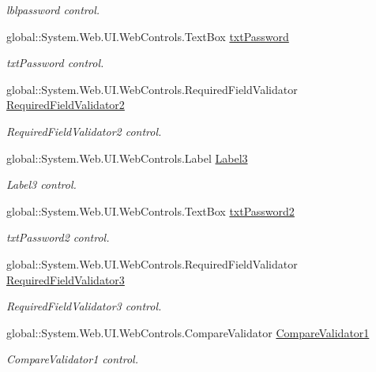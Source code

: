 \begin{DoxyCompactItemize}
\begin{DoxyCompactList}\small\item\em lblpassword control. \end{DoxyCompactList}\item 
global\+::\+System.\+Web.\+U\+I.\+Web\+Controls.\+Text\+Box \mbox{\hyperlink{classwebprueba_1_1_cambiar_password_af63494732a261ab56a7acbe72b1a1878}{txt\+Password}}
\begin{DoxyCompactList}\small\item\em txt\+Password control. \end{DoxyCompactList}\item 
global\+::\+System.\+Web.\+U\+I.\+Web\+Controls.\+Required\+Field\+Validator \mbox{\hyperlink{classwebprueba_1_1_cambiar_password_a961a06f8d25322b712d493b0beaed825}{Required\+Field\+Validator2}}
\begin{DoxyCompactList}\small\item\em Required\+Field\+Validator2 control. \end{DoxyCompactList}\item 
global\+::\+System.\+Web.\+U\+I.\+Web\+Controls.\+Label \mbox{\hyperlink{classwebprueba_1_1_cambiar_password_a1f569bd85bd6b9f74952e02f179ce7ed}{Label3}}
\begin{DoxyCompactList}\small\item\em Label3 control. \end{DoxyCompactList}\item 
global\+::\+System.\+Web.\+U\+I.\+Web\+Controls.\+Text\+Box \mbox{\hyperlink{classwebprueba_1_1_cambiar_password_a9bfea087d5a804784fb94f218366b303}{txt\+Password2}}
\begin{DoxyCompactList}\small\item\em txt\+Password2 control. \end{DoxyCompactList}\item 
global\+::\+System.\+Web.\+U\+I.\+Web\+Controls.\+Required\+Field\+Validator \mbox{\hyperlink{classwebprueba_1_1_cambiar_password_a598719ee05f318e2afcc63bc2fcfc627}{Required\+Field\+Validator3}}
\begin{DoxyCompactList}\small\item\em Required\+Field\+Validator3 control. \end{DoxyCompactList}\item 
global\+::\+System.\+Web.\+U\+I.\+Web\+Controls.\+Compare\+Validator \mbox{\hyperlink{classwebprueba_1_1_cambiar_password_a422d280bae9c9f3858b263638410b86a}{Compare\+Validator1}}
\begin{DoxyCompactList}\small\item\em Compare\+Validator1 control. \end{DoxyCompactList}\item 

\end{DoxyCompactItemize}
